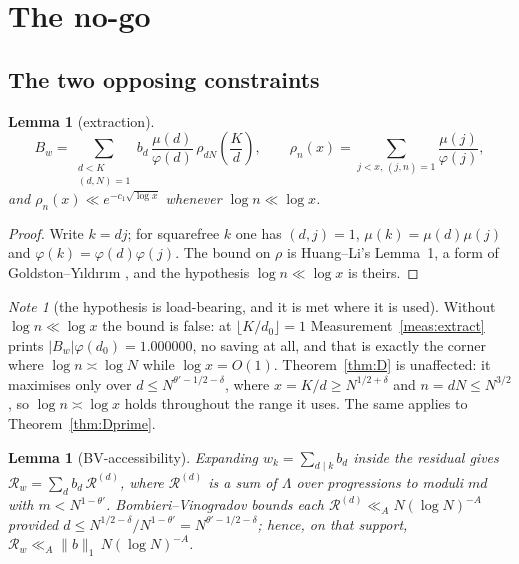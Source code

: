\documentclass[11pt,a4paper]{article}
\theoremstyle{plain}
\newtheorem{lemma}[theorem]{Lemma}
\theoremstyle{definition}
\theoremstyle{remark}
\newtheorem{note}[theorem]{Note}
\begin{document}
\section{The no-go}\label{sec:nogo}

\subsection{The two opposing constraints}

\begin{lemma}[extraction]\label{lem:extract}
\[
  B_w=\sum_{\substack{d<K\\(d,N)=1}}b_d\,
   \frac{\mu(d)}{\varphi(d)}\,\rho_{dN}\!\left(\frac{K}{d}\right),
  \qquad
  \rho_{n}(x)=\!\!\sum_{j<x,\,(j,n)=1}\!\!\frac{\mu(j)}{\varphi(j)},
\]
and $\rho_n(x)\ll e^{-c_1\sqrt{\log x}}$ whenever $\log n\ll\log x$.
\end{lemma}

\begin{proof}
Write $k=dj$; for squarefree $k$ one has $(d,j)=1$,
$\mu(k)=\mu(d)\mu(j)$ and $\varphi(k)=\varphi(d)\varphi(j)$. The bound
on $\rho$ is Huang--Li's Lemma~1, a form of
Goldston--Y{\i}ld{\i}r{\i}m \cite{GY}, and the hypothesis
$\log n\ll\log x$ is theirs.
\end{proof}

\begin{note}[the hypothesis is load-bearing, and it is met where it is used]
Without $\log n\ll\log x$ the bound is false: at $\lfloor K/d_0\rfloor=1$
Measurement~\ref{meas:extract} prints $|B_w|\varphi(d_0)=1.000000$, no
saving at all, and that is exactly the corner where $\log n\asymp\log N$
while $\log x=O(1)$. Theorem~\ref{thm:D} is unaffected: it maximises
only over $d\le N^{\theta'-1/2-\delta}$, where $x=K/d\ge N^{1/2+\delta}$
and $n=dN\le N^{3/2}$, so $\log n\asymp\log x$ holds throughout the
range it uses. The same applies to Theorem~\ref{thm:Dprime}.
\end{note}

\begin{lemma}[BV-accessibility]\label{lem:bv}
Expanding $w_k=\sum_{d\mid k}b_d$ inside the residual gives
$\mathcal R_w=\sum_db_d\,\mathcal R^{(d)}$, where $\mathcal R^{(d)}$
is a sum of $\Lambda$ over progressions to moduli $md$ with
$m<N^{1-\theta'}$. Bombieri--Vinogradov bounds each
$\mathcal R^{(d)}\ll_AN(\log N)^{-A}$ provided
$d\le N^{1/2-\delta}/N^{1-\theta'}=N^{\theta'-1/2-\delta}$; hence, on
that support, $\mathcal R_w\ll_A\|b\|_1\,N(\log N)^{-A}$.
\end{lemma}
\end{document}
